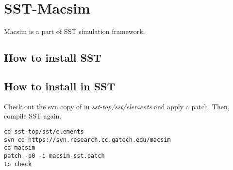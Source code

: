 
\clearpage
\section{SST-Macsim}

Macsim is a part of SST simulation framework.

\subsection{How to install SST}

\subsection{How to install \SIM in SST}

Check out the svn copy of \SIM in \textit{sst-top/sst/elements} and
apply a patch. Then, compile SST again.

\smallskip
\begin{lstlisting}
cd sst-top/sst/elements
svn co https://svn.research.cc.gatech.edu/macsim
cd macsim
patch -p0 -i macsim-sst.patch
to check
\end{lstlisting}
\smallskip




